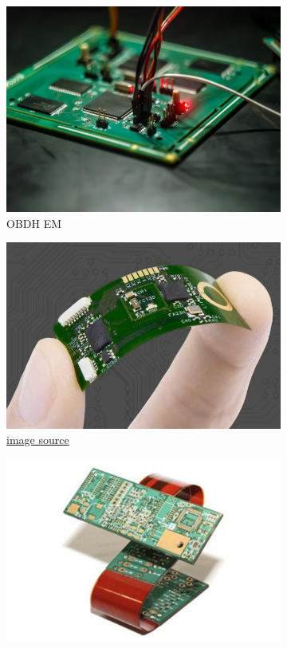 \documentclass[final]{cubedoc}
\begin{document}
	\begin{figure}[h!]
		\centering
		\begin{subfigure}{.3\textwidth}
			\centering
			\includegraphics[height=0.2\textheight, width=.8\textwidth]{assets/rigid_obc.jpg}
			\caption{OBDH EM}
			\label{fig:sub1}
		\end{subfigure}%
		\begin{subfigure}{.3\textwidth}
			\centering
			\includegraphics[height=0.2\textheight, width=.8\textwidth]{assets/flex.jpg}
			\caption{\href{https://web.archive.org/web/20200813150519/https://sfxpcb.com/flex-pcb-vs-ceramic-pcb/}{image source}}
			\label{fig:sub2}
		\end{subfigure}
		\begin{subfigure}{.3\textwidth}
			\centering
			\includegraphics[height=0.2\textheight, width=.8\textwidth]{assets/rigid_flex.jpg}

\end{subfigure}
\end{figure}
\end{document}
